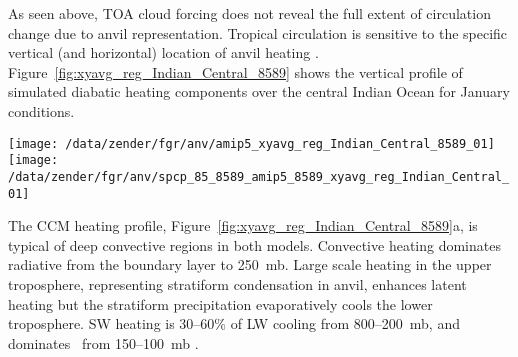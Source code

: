 \documentclass[twoside,agupp]{aguplus}
\begin{document}
As seen above, TOA cloud forcing does not reveal the full extent of 
circulation change due to anvil representation. 
Tropical circulation is sensitive to the specific vertical (and
horizontal) location of anvil heating \cite[]{RaR891,SRB94}. 
Figure~\ref{fig:xyavg_reg_Indian_Central_8589} shows
the vertical profile of simulated diabatic heating components over 
the central Indian Ocean for January conditions.
\begin{figure*}
\begin{center}
\texttt{[image: /data/zender/fgr/anv/amip5\_xyavg\_reg\_Indian\_Central\_8589\_01]}%
\texttt{[image: /data/zender/fgr/anv/spcp\_85\_8589\_amip5\_8589\_xyavg\_reg\_Indian\_Central\_01]}%
\end{center}
\caption[Model simulated profiles of diabatic heating
and differences between models (ANV$-$CCM) over the central 
Indian Ocean for 1985--1989 January]{
Model simulated profiles of (a) diabatic heating
(\kxday), and (b) differences between models (ANV$-$CCM) for the
central Indian Ocean (15\,\dgr S--5\,\dgr N, 60--80\,\dgr E) 
for 1985--1989 January.
Heatings shown are total diabatic (solid), shortwave (dotted),
longwave (short dash), resolved (dash-dot), turbulent
(dash-dot-dot-dot), and convective (long dash).
Note difference in scales.
\label{fig:xyavg_reg_Indian_Central_8589}}
\end{figure*}
The CCM heating profile,
Figure~\ref{fig:xyavg_reg_Indian_Central_8589}a, is typical of deep
convective regions in both models. 
Convective heating dominates radiative from the boundary layer to
250~mb. 
Large scale heating in the upper troposphere, representing stratiform
condensation in anvil, enhances latent heating but the stratiform
precipitation evaporatively cools the lower troposphere.
SW heating is 30--60\% of LW cooling from 800--200~mb, and dominates
\QT\ from 150--100~mb \cite[]{RaR891}. 
\end{document}
